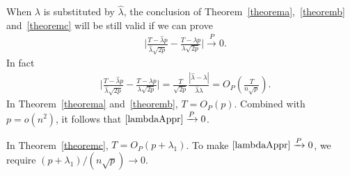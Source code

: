 \documentclass[review]{elsarticle}
\theoremstyle{plain}
\theoremstyle{definition}
\theoremstyle{remark}
\begin{document}
 When $\lambda$ is substituted by $\hat{\lambda}$,
 the conclusion of Theorem~\ref{theorema},~\ref{theoremb} and~\ref{theoremc} will be still valid if we can prove
\begin{equation*}
    \begin{aligned}
        &\Big|\frac{T-{\hat{\lambda} p}}{\hat{\lambda}\sqrt{2p}}-
        \frac{T-{\lambda p}}{\lambda\sqrt{2p}}\Big|\xrightarrow{P} 0.
    \end{aligned}
\end{equation*}
In fact
\begin{equation}\label{lambdaAppr}
    \begin{aligned}
        &\Big|\frac{T-{\hat{\lambda} p}}{\hat{\lambda}\sqrt{2p}}-
        \frac{T-{\lambda p}}{\lambda\sqrt{2p}}\Big|
        =\frac{T}{\sqrt{2p}}\frac{|\hat{\lambda}-\lambda|}{\hat{\lambda}\lambda}
        =O_P(\frac{T}{n\sqrt{p}}).
    \end{aligned}
\end{equation}
In Theorem~\ref{theorema} and~\ref{theoremb}, $T=O_P(p)$. Combined with $p=o(n^2)$, it follows that $\eqref{lambdaAppr}\xrightarrow{P} 0$.

In Theorem~\ref{theoremc}, $T=O_P(p+\lambda_1)$. To make $\eqref{lambdaAppr}\xrightarrow{P} 0$, we require ${(p+\lambda_1)}/{(n\sqrt{p})}\to 0$.
\end{document}

